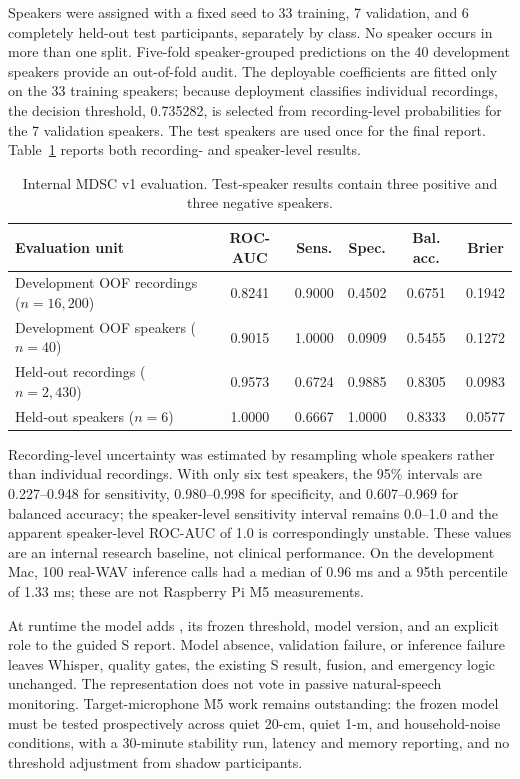 \documentclass[11pt,a4paper]{article}
\begin{document}
Speakers were assigned with a fixed seed to 33 training, 7 validation, and 6 completely held-out test participants, separately by class. No speaker occurs in more than one split. Five-fold speaker-grouped predictions on the 40 development speakers provide an out-of-fold audit. The deployable coefficients are fitted only on the 33 training speakers; because deployment classifies individual recordings, the decision threshold, 0.735282, is selected from recording-level probabilities for the 7 validation speakers. The test speakers are used once for the final report. Table~\ref{tab:mdsc-results} reports both recording- and speaker-level results.

\begin{table}[htbp]
\centering
\small
\caption{Internal MDSC v1 evaluation. Test-speaker results contain three positive and three negative speakers.}
\label{tab:mdsc-results}
\begin{tabular}{lccccc}
\toprule
Evaluation unit & ROC-AUC & Sens. & Spec. & Bal. acc. & Brier \\
\midrule
Development OOF recordings ($n=16{,}200$) & 0.8241 & 0.9000 & 0.4502 & 0.6751 & 0.1942 \\
Development OOF speakers ($n=40$) & 0.9015 & 1.0000 & 0.0909 & 0.5455 & 0.1272 \\
Held-out recordings ($n=2{,}430$) & 0.9573 & 0.6724 & 0.9885 & 0.8305 & 0.0983 \\
Held-out speakers ($n=6$) & 1.0000 & 0.6667 & 1.0000 & 0.8333 & 0.0577 \\
\bottomrule
\end{tabular}
\end{table}

Recording-level uncertainty was estimated by resampling whole speakers rather than individual recordings. With only six test speakers, the 95\% intervals are 0.227--0.948 for sensitivity, 0.980--0.998 for specificity, and 0.607--0.969 for balanced accuracy; the speaker-level sensitivity interval remains 0.0--1.0 and the apparent speaker-level ROC-AUC of 1.0 is correspondingly unstable. These values are an internal research baseline, not clinical performance. On the development Mac, 100 real-WAV inference calls had a median of 0.96 ms and a 95th percentile of 1.33 ms; these are not Raspberry Pi M5 measurements.

At runtime the model adds , its frozen threshold, model version, and an explicit  role to the guided S report. Model absence, validation failure, or inference failure leaves Whisper, quality gates, the existing S result, fusion, and emergency logic unchanged. The representation does not vote in passive natural-speech monitoring. Target-microphone M5 work remains outstanding: the frozen model must be tested prospectively across quiet 20-cm, quiet 1-m, and household-noise conditions, with a 30-minute stability run, latency and memory reporting, and no threshold adjustment from shadow participants.
\end{document}
